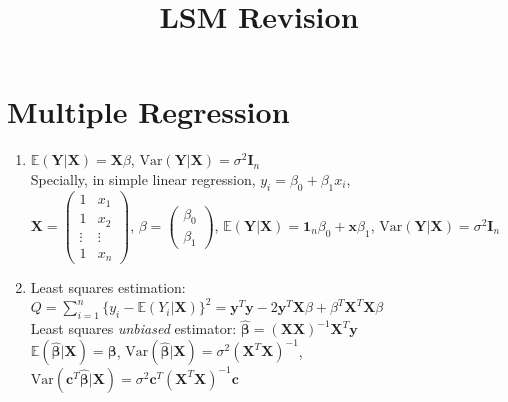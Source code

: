 \documentclass[11pt,a4paper]{article}
\title{LSM Revision}
\begin{document}
\section*{Multiple Regression}

\begin{enumerate}
\item $\mathbb{E}(\mathbf{Y} | \mathbf{X}) = \mathbf{X} \beta$, $\mathrm{Var}(\mathbf{Y} | \mathbf{X}) = \sigma^2 \mathbf{I}_n$ \\
Specially, in simple linear regression, $y_i = \beta_0 + \beta_1 x_i$, \\
$\mathbf{X} = \begin{pmatrix}
1 & x_1 \\
1 & x_2 \\
\vdots & \vdots \\
1 & x_n
\end{pmatrix}$, $\beta = \begin{pmatrix}
\beta_0 \\
\beta_1
\end{pmatrix}$, $\mathbb{E}(\mathbf{Y} | \mathbf{X}) = \mathbf{1}_n \beta_0 + \mathbf{x} \beta_1$, $\mathrm{Var}(\mathbf{Y} | \mathbf{X}) = \sigma^2 \mathbf{I}_n$

\item Least squares estimation: $\displaystyle Q = \sum_{i=1}^n \{ y_i - \mathbb{E} (Y_i | \mathbf{X}) \}^2 = \mathbf{y}^T \mathbf{y} - 2 \mathbf{y}^T \mathbf{X} \beta + \beta^T \mathbf{X}^T \mathbf{X} \beta$ \\
Least squares \emph{unbiased} estimator: $\hat{\boldsymbol \beta} = (\mathbf{X} \mathbf{X})^{-1} \mathbf{X}^T \mathbf{y}$ \\
$\mathbb{E} (\hat{\boldsymbol \beta} | \mathbf{X}) = \boldsymbol{\beta}$, $\mathrm{Var} (\hat{\boldsymbol \beta} | \mathbf{X}) = \sigma^2 (\mathbf{X}^T \mathbf{X})^{-1}$, $\mathrm{Var} (\mathbf{c}^T \hat{\boldsymbol \beta} | \mathbf{X}) = \sigma^2 \mathbf{c}^T (\mathbf{X}^T \mathbf{X})^{-1} \mathbf{c}$


\end{enumerate}
\end{document}
